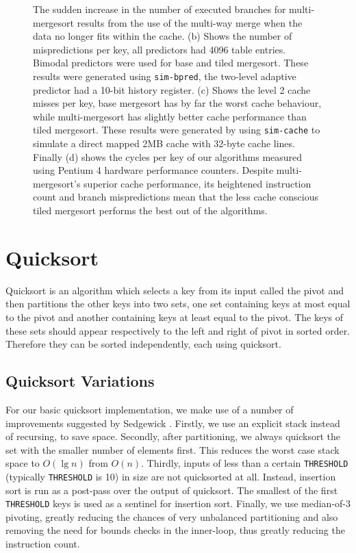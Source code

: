 \documentclass[acmtocl]{acmtrans2m}
\begin{document}
\begin{figure}
{The sudden increase in the number of executed branches for multi-mergesort
results from the use of the multi-way merge when the data no longer fits within
the cache. (b) Shows the number of mispredictions per key, all predictors had
4096 table entries. Bimodal predictors were used for base and tiled mergesort.
These results were generated using \texttt{sim-bpred}, the two-level adaptive
predictor had a 10-bit history register.  (c) Shows the level 2 cache misses per
key, base mergesort has by far the worst cache behaviour, while multi-mergesort
has slightly better cache performance than tiled mergesort. These results were
generated by using \texttt{sim-cache} to simulate a direct mapped 2MB cache with
32-byte cache lines. Finally (d) shows the cycles per key of our algorithms
measured using Pentium 4 hardware performance counters. Despite
multi-mergesort's superior cache performance, its heightened instruction count
and branch mispredictions mean that the less cache conscious tiled mergesort
performs the best out of the algorithms.}
\label{mergesort_branch_results}
\end{figure}

\section{Quicksort}

Quicksort \cite{Hoare62} is an algorithm which selects a key from its input
called the pivot and then partitions the other keys into two sets, one set
containing keys at most equal to the pivot and another containing keys at least
equal to the pivot. The keys of these sets should appear respectively to the
left and right of pivot in sorted order.  Therefore they can be sorted
independently, each using quicksort.

\subsection{Quicksort Variations}

For our basic quicksort implementation, we make use of a number of improvements
suggested by Sedgewick \citeyear{Sedgewick78}. Firstly, we use an explicit stack
instead of recursing, to save space. Secondly, after partitioning, we always
quicksort the set with the smaller number of elements first.  This reduces the
worst case stack space to $O(\lg n)$ from $O(n)$.  Thirdly, inputs of less than
a certain \texttt{THRESHOLD} (typically \texttt{THRESHOLD} is 10) in size are
not quicksorted at all. Instead, insertion sort is run as a post-pass over the
output of quicksort.  The smallest of the first \texttt{THRESHOLD} keys is used
as a sentinel for insertion sort.  Finally, we use median-of-3 pivoting, greatly
reducing the chances of very unbalanced partitioning and also removing the need
for bounds checks in the inner-loop, thus greatly reducing the instruction
count.
\end{document}
